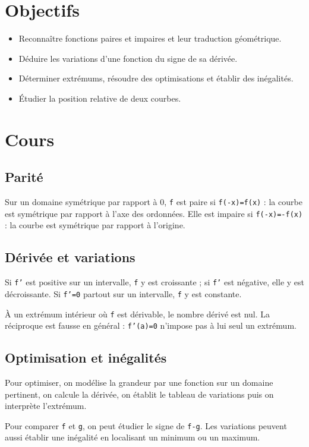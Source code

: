 \section{Objectifs}
\begin{itemize}
\item Reconnaître fonctions paires et impaires et leur traduction géométrique.
\item Déduire les variations d'une fonction du signe de sa dérivée.
\item Déterminer extrémums, résoudre des optimisations et établir des inégalités.
\item Étudier la position relative de deux courbes.
\end{itemize}

\section{Cours}
\subsection{Parité}
Sur un domaine symétrique par rapport à 0, \texttt{f} est paire si \texttt{f(-x)=f(x)} : la courbe est symétrique par rapport à l'axe des ordonnées. Elle est impaire si \texttt{f(-x)=-f(x)} : la courbe est symétrique par rapport à l'origine.

\subsection{Dérivée et variations}
Si \texttt{f'} est positive sur un intervalle, \texttt{f} y est croissante ; si \texttt{f'} est négative, elle y est décroissante. Si \texttt{f'=0} partout sur un intervalle, \texttt{f} y est constante.

À un extrémum intérieur où \texttt{f} est dérivable, le nombre dérivé est nul. La réciproque est fausse en général : \texttt{f'(a)=0} n'impose pas à lui seul un extrémum.

\subsection{Optimisation et inégalités}
Pour optimiser, on modélise la grandeur par une fonction sur un domaine pertinent, on calcule la dérivée, on établit le tableau de variations puis on interprète l'extrémum.

Pour comparer \texttt{f} et \texttt{g}, on peut étudier le signe de \texttt{f-g}. Les variations peuvent aussi établir une inégalité en localisant un minimum ou un maximum.

